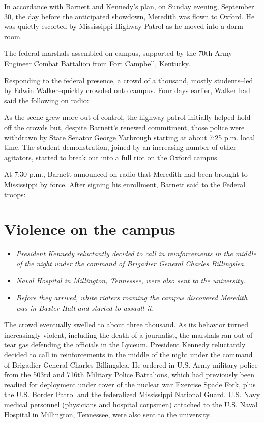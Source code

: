 In accordance with Barnett and Kennedy's plan, on Sunday evening,
September 30, the day before the anticipated showdown, Meredith was
flown to Oxford. He was quietly escorted by Mississippi Highway Patrol
as he moved into a dorm room.

The federal marshals assembled on campus, supported by the 70th Army
Engineer Combat Battalion from Fort Campbell, Kentucky.

Responding to the federal presence, a crowd of a thousand, mostly
students--led by Edwin Walker--quickly crowded onto campus. Four days
earlier, Walker had said the following on radio:

As the scene grew more out of control, the highway patrol initially
helped hold off the crowds but, despite Barnett's renewed commitment,
those police were withdrawn by State Senator George Yarbrough starting
at about 7:25 p.m. local time. The student demonstration, joined by an
increasing number of other agitators, started to break out into a full
riot on the Oxford campus.

At 7:30 p.m., Barnett announced on radio that Meredith had been brought
to Mississippi by force. After signing his enrollment, Barnett said to
the Federal troops:

\section{Violence on the campus}\label{violence-on-the-campus}

\begin{itemize}
\item
  \emph{President Kennedy reluctantly decided to call in reinforcements
  in the middle of the night under the command of Brigadier General
  Charles Billingslea.}
\item
  \emph{Naval Hospital in Millington, Tennessee, were also sent to the
  university.}
\item
  \emph{Before they arrived, white rioters roaming the campus discovered
  Meredith was in Baxter Hall and started to assault it.}
\end{itemize}

The crowd eventually swelled to about three thousand. As its behavior
turned increasingly violent, including the death of a journalist, the
marshals ran out of tear gas defending the officials in the Lyceum.
President Kennedy reluctantly decided to call in reinforcements in the
middle of the night under the command of Brigadier General Charles
Billingslea. He ordered in U.S. Army military police from the 503rd and
716th Military Police Battalions, which had previously been readied for
deployment under cover of the nuclear war Exercise Spade Fork, plus the
U.S. Border Patrol and the federalized Mississippi National Guard. U.S.
Navy medical personnel (physicians and hospital corpsmen) attached to
the U.S. Naval Hospital in Millington, Tennessee, were also sent to the
university.

